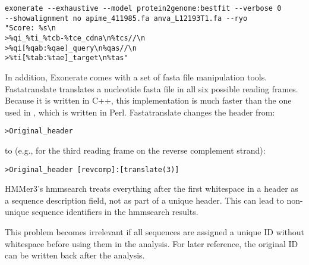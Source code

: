 \begin{verbatim}
exonerate --exhaustive --model protein2genome:bestfit --verbose 0 
--showalignment no apime_411985.fa anva_L12193T1.fa --ryo 
"Score: %s\n
>%qi_%ti_%tcb-%tce_cdna\n%tcs//\n
>%qi[%qab:%qae]_query\n%qas//\n
>%ti[%tab:%tae]_target\n%tas" 
\end{verbatim}

In addition, Exonerate comes with a set of fasta file manipulation tools.
Fastatranslate translates a nucleotide fasta file in all six possible reading
frames. Because it is written in C++, this implementation is much faster than the
one used in \hamstr, which is written in Perl. Fastatranslate changes the
header from:

\begin{verbatim}
>Original_header
\end{verbatim}

to (e.g., for the third reading frame on the reverse complement strand):

\begin{verbatim}
>Original_header [revcomp]:[translate(3)]
\end{verbatim}

HMMer3's hmmsearch treats everything after the first whitespace in a header as a
sequence description field, not as part of a unique header. This can lead to
non-unique sequence identifiers in the hmmsearch results. 

\label{uniq}
This problem becomes irrelevant if all sequences are assigned a unique ID
without whitespace before using them in the analysis. For later reference, the
original ID can be written back after the analysis. 
